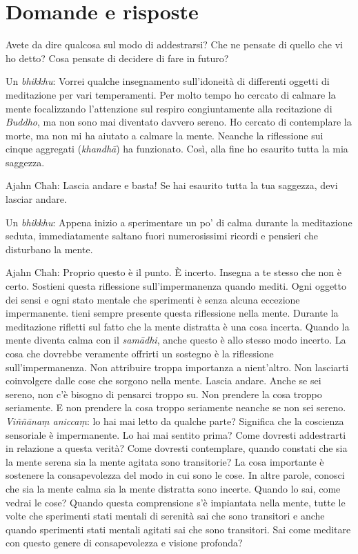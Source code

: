 \section{Domande e risposte}

Avete da dire qualcosa sul modo di addestrarsi? Che ne pensate di quello
che vi ho detto? Cosa pensate di decidere di fare in futuro?

Un \emph{bhikkhu}: Vorrei qualche insegnamento sull'idoneità di
differenti oggetti di meditazione per vari temperamenti. Per molto tempo
ho cercato di calmare la mente focalizzando l'attenzione sul respiro
congiuntamente alla recitazione di \emph{Buddho}, ma non sono mai
diventato davvero sereno. Ho cercato di contemplare la morte, ma non mi
ha aiutato a calmare la mente. Neanche la riflessione sui cinque
aggregati (\emph{khandhā}) ha funzionato. Così, alla fine ho esaurito
tutta la mia saggezza.

Ajahn Chah: Lascia andare e basta! Se hai esaurito tutta la tua
saggezza, devi lasciar andare.

Un \emph{bhikkhu}: Appena inizio a sperimentare un po' di calma durante
la meditazione seduta, immediatamente saltano fuori numerosissimi
ricordi e pensieri che disturbano la mente.

Ajahn Chah: Proprio questo è il punto. È incerto. Insegna a te stesso
che non è certo. Sostieni questa riflessione sull'impermanenza quando
mediti. Ogni oggetto dei sensi e ogni stato mentale che sperimenti è
senza alcuna eccezione impermanente. tieni sempre presente questa
riflessione nella mente. Durante la meditazione rifletti sul fatto che
la mente distratta è una cosa incerta. Quando la mente diventa calma con
il \emph{samādhi}, anche questo è allo stesso modo incerto. La cosa che
dovrebbe veramente offrirti un sostegno è la riflessione
sull'impermanenza. Non attribuire troppa importanza a nient'altro. Non
lasciarti coinvolgere dalle cose che sorgono nella mente. Lascia andare.
Anche se sei sereno, non c'è bisogno di pensarci troppo su. Non prendere
la cosa troppo seriamente. E non prendere la cosa troppo seriamente
neanche se non sei sereno. \emph{Viññānaṃ aniccaṃ}: lo hai mai letto da
qualche parte? Significa che la coscienza sensoriale è impermanente. Lo
hai mai sentito prima? Come dovresti addestrarti in relazione a questa
verità? Come dovresti contemplare, quando constati che sia la mente
serena sia la mente agitata sono transitorie? La cosa importante è
sostenere la consapevolezza del modo in cui sono le cose. In altre
parole, conosci che sia la mente calma sia la mente distratta sono
incerte. Quando lo sai, come vedrai le cose? Quando questa comprensione
s'è impiantata nella mente, tutte le volte che sperimenti stati mentali
di serenità sai che sono transitori e anche quando sperimenti stati
mentali agitati sai che sono transitori. Sai come meditare con questo
genere di consapevolezza e visione profonda?

